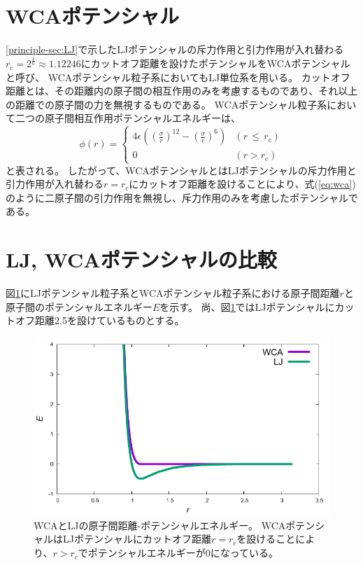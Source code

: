 \documentclass[titlepage]{jsreport}
\begin{document}
\section{WCAポテンシャル}\label{principle-sec:WCA}
\ref{principle-sec:LJ}で示したLJポテンシャルの斥力作用と引力作用が入れ替わる$r_c=2^{\frac{1}{6}}{\approx}1.12246$にカットオフ距離を設けたポテンシャルをWCAポテンシャルと呼び、
WCAポテンシャル粒子系においてもLJ単位系を用いる。
カットオフ距離とは、その距離内の原子間の相互作用のみを考慮するものであり、それ以上の距離での原子間の力を無視するものである\cite{cutoff}。
WCAポテンシャル粒子系において二つの原子間相互作用ポテンシャルエネルギーは、
\large
\begin{equation}
\phi(r) = \left\{ \begin{array}{ll}
    4{\epsilon}\left(\left(\frac{\sigma}{r}\right)^{12}-\left(\frac{\sigma}{r}\right)^6\right) & (r\,{\leq}\,{r_c}) \\
    0 & (r>r_c)\label{eq:wca}
\end{array} \right.
\end{equation}
\normalsize
と表される\cite{wca}。
したがって、WCAポテンシャルとはLJポテンシャルの斥力作用と引力作用が入れ替わる$r=r_c$にカットオフ距離を設けることにより、式(\ref{eq:wca})のように二原子間の引力作用を無視し、斥力作用のみを考慮したポテンシャルである。


\section{LJ, WCAポテンシャルの比較}\label{principle-sec:LJ-WCA}
図\ref{fig:dis-poen}にLJポテンシャル粒子系とWCAポテンシャル粒子系における原子間距離$r$と原子間のポテンシャルエネルギー$E$を示す。
尚、図\ref{fig:dis-poen}ではLJポテンシャルにカットオフ距離2.5を設けているものとする。

\newpage
\begin{figure}[htbp]
    \begin{center}
        \includegraphics[width=14cm]{fig/dis-poen/dis-poen.pdf}
    \end{center}
    \caption{WCAとLJの原子間距離-ポテンシャルエネルギー。
    WCAポテンシャルはLJポテンシャルにカットオフ距離$r=r_c$を設けることにより、$r>r_c$でポテンシャルエネルギーが0になっている。}
    \label{fig:dis-poen}
\end{figure}
\end{document}
